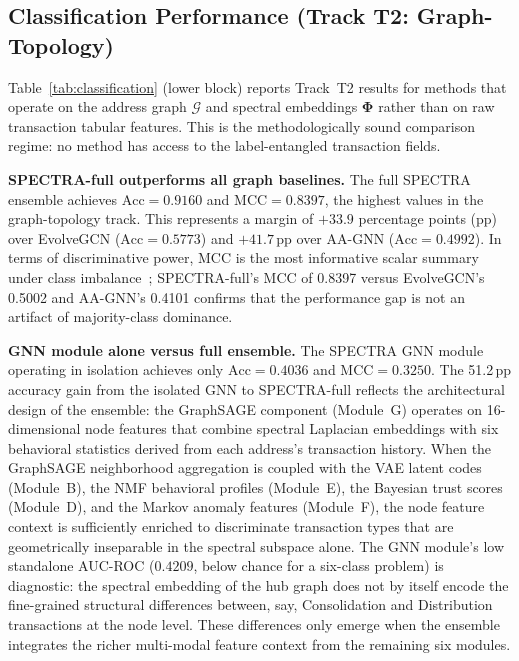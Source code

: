 \documentclass[journal]{IEEEtran}
\begin{document}

\subsection{Classification Performance (Track T2: Graph-Topology)}
\label{subsec:t2_results}

Table~\ref{tab:classification} (lower block) reports Track~T2 results for
methods that operate on the address graph $\mathcal{G}$ and spectral
embeddings $\boldsymbol{\Phi}$ rather than on raw transaction tabular features.
This is the methodologically sound comparison regime: no method has access
to the label-entangled transaction fields.

\textbf{SPECTRA-full outperforms all graph baselines.}
The full SPECTRA ensemble achieves $\text{Acc} = \num{0.9160}$ and
$\text{MCC} = \num{0.8397}$, the highest values in the graph-topology track.
This represents a margin of $+\num{33.9}$ percentage points (pp) over
EvolveGCN ($\text{Acc} = \num{0.5773}$) and $+\num{41.7}$\,pp over
AA-GNN ($\text{Acc} = \num{0.4992}$).
In terms of discriminative power, MCC is the most informative scalar
summary under class imbalance~\cite{Chicco2020}; SPECTRA-full's MCC of
\num{0.8397} versus EvolveGCN's \num{0.5002} and AA-GNN's \num{0.4101}
confirms that the performance gap is not an artifact of majority-class
dominance.

\textbf{GNN module alone versus full ensemble.}
The SPECTRA GNN module operating in isolation achieves only
$\text{Acc} = \num{0.4036}$ and $\text{MCC} = \num{0.3250}$.
The \num{51.2}\,pp accuracy gain from the isolated GNN to SPECTRA-full
reflects the architectural design of the ensemble: the GraphSAGE component
(Module~G) operates on 16-dimensional node features that combine spectral
Laplacian embeddings with six behavioral statistics derived from each
address's transaction history.
When the GraphSAGE neighborhood aggregation is coupled with the VAE latent
codes (Module~B), the NMF behavioral profiles (Module~E), the Bayesian
trust scores (Module~D), and the Markov anomaly features (Module~F),
the node feature context is sufficiently enriched to discriminate
transaction types that are geometrically inseparable in the spectral
subspace alone.
The GNN module's low standalone AUC-ROC ($\num{0.4209}$, below chance for
a six-class problem) is diagnostic: the spectral embedding of the hub graph
does not by itself encode the fine-grained structural differences between,
say, Consolidation and Distribution transactions at the node level.
These differences only emerge when the ensemble integrates the richer
multi-modal feature context from the remaining six modules.
\end{document}
